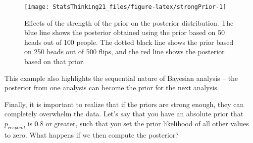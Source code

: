 \documentclass[]{book}
\newenvironment{Shaded}{\begin{snugshade}}{\end{snugshade}}
\newcommand{\KeywordTok}[1]{\textcolor[rgb]{0.13,0.29,0.53}{\textbf{#1}}}
\newcommand{\DataTypeTok}[1]{\textcolor[rgb]{0.13,0.29,0.53}{#1}}
\newcommand{\DecValTok}[1]{\textcolor[rgb]{0.00,0.00,0.81}{#1}}
\newcommand{\FloatTok}[1]{\textcolor[rgb]{0.00,0.00,0.81}{#1}}
\newcommand{\StringTok}[1]{\textcolor[rgb]{0.31,0.60,0.02}{#1}}
\newcommand{\CommentTok}[1]{\textcolor[rgb]{0.56,0.35,0.01}{\textit{#1}}}
\newcommand{\OperatorTok}[1]{\textcolor[rgb]{0.81,0.36,0.00}{\textbf{#1}}}
\newcommand{\NormalTok}[1]{#1}
\theoremstyle{definition}
\theoremstyle{definition}
\theoremstyle{definition}
\theoremstyle{remark}
\begin{document}
\begin{figure}
\texttt{[image: StatsThinking21\_files/figure-latex/strongPrior-1]} \caption{Effects of the strength of the prior on the posterior distribution. The blue line shows the posterior obtained using the prior based on 50 heads out of 100 people.  The dotted black line shows the prior based on 250 heads out of 500 flips, and the red line shows the posterior based on that prior.}\label{fig:strongPrior}
\end{figure}

This example also highlights the sequential nature of Bayesian analysis
-- the posterior from one analysis can become the prior for the next
analysis.

Finally, it is important to realize that if the priors are strong
enough, they can completely overwhelm the data. Let's say that you have
an absolute prior that \(p_{respond}\) is 0.8 or greater, such that you
set the prior likelihood of all other values to zero. What happens if we
then compute the posterior?

\begin{Shaded}
\end{Shaded}
\end{document}
